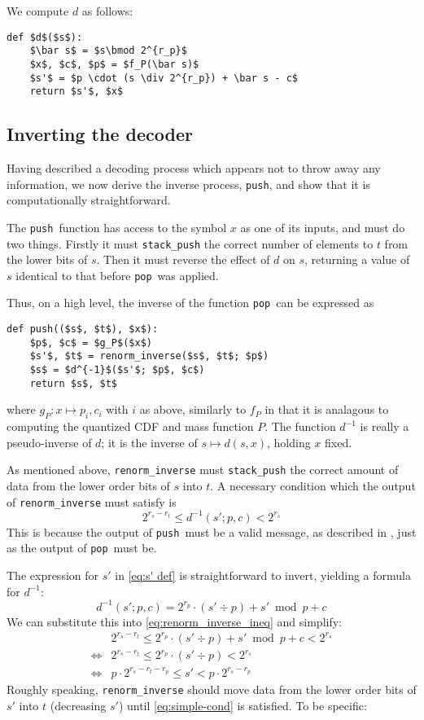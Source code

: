 \documentclass{article}
\newcommand{\push}{\texttt{push}}
\newcommand{\pop}{\texttt{pop}}
\begin{document}
We compute \(d\) as follows:
\begin{lstlisting}
def $d$($s$):
    $\bar s$ = $s\bmod 2^{r_p}$
    $x$, $c$, $p$ = $f_P(\bar s)$
    $s'$ = $p \cdot (s \div 2^{r_p}) + \bar s - c$
    return $s'$, $x$
\end{lstlisting}

\subsection{Inverting the decoder}
Having described a decoding process which appears not to throw away any
information, we now derive the inverse process, \push, and show that it is
computationally straightforward.

The \push\ function has access to the symbol \(x\) as one of its inputs, and
must do two things. Firstly it must \texttt{stack\_push} the correct number of
elements to \(t\) from the lower bits of \(s\). Then it must reverse the effect
of \(d\) on \(s\), returning a value of \(s\) identical to that before \pop\
was applied.

Thus, on a high level, the inverse of the function \pop\ can be expressed as
\begin{lstlisting}
def push(($s$, $t$), $x$):
    $p$, $c$ = $g_P$($x$)
    $s'$, $t$ = renorm_inverse($s$, $t$; $p$)
    $s$ = $d^{-1}$($s'$; $p$, $c$)
    return $s$, $t$
\end{lstlisting}
where \(g_P:x\mapsto p_i, c_i\) with \(i\) as above, similarly to \(f_P\) in
that it is analagous to computing the quantized CDF and mass function \(P\).
The function \(d^{-1}\) is really a pseudo-inverse of \(d\); it is the inverse
of \(s\mapsto d(s, x)\), holding \(x\) fixed.

As mentioned above, \texttt{renorm\_inverse} must \texttt{stack\_push} the
correct amount of data from the lower order bits of \(s\) into \(t\). A
necessary condition which the output of \texttt{renorm\_inverse} must satisfy
is
\begin{equation}\label{eq:renorm_inverse_ineq}
  2^{r_s - r_t} \leq d^{-1}(s'; p, c) < 2^{r_s}
\end{equation}
This is because the output of \push\ must be a valid message, as described in
\Cref{sec:message}, just as the output of \pop\ must be.

The expression for \(s'\) in \cref{eq:s' def} is straightforward to invert,
yielding a formula for
\(d^{-1}\):
\begin{equation}
  d^{-1}(s'; p, c) = 2^{r_p} \cdot (s' \div p) + s' \bmod p + c
\end{equation}
We can substitute this into \cref{eq:renorm_inverse_ineq} and simplify:
\begin{align}
  &2^{r_s - r_t} \leq 2^{r_p} \cdot (s' \div p) + s' \bmod p + c < 2^{r_s}\\
  \iff&2^{r_s - r_t} \leq 2^{r_p} \cdot (s' \div p) < 2^{r_s}\\
  \iff&p\cdot2^{r_s - r_t - r_p}\leq s' < p\cdot 2^{r_s -
  r_p}\label{eq:simple-cond}
\end{align}
Roughly speaking, \texttt{renorm\_inverse} should move data from the lower
order bits of \(s'\) into \(t\) (decreasing \(s'\)) until \cref{eq:simple-cond}
is satisfied. To be specific:
\end{document}
